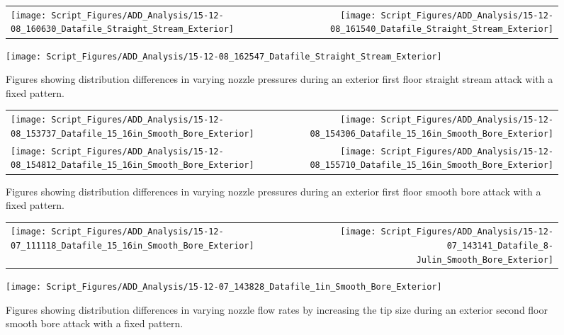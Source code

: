 \documentclass{article}
\begin{document}
\begin{figure}[ht]
\begin{tabular*}{\textwidth}{lr}
\texttt{[image: Script\_Figures/ADD\_Analysis/15-12-08\_160630\_Datafile\_Straight\_Stream\_Exterior]} &
\texttt{[image: Script\_Figures/ADD\_Analysis/15-12-08\_161540\_Datafile\_Straight\_Stream\_Exterior]} \\
\end{tabular*}
\centering
\texttt{[image: Script\_Figures/ADD\_Analysis/15-12-08\_162547\_Datafile\_Straight\_Stream\_Exterior]} \\
\caption{Figures showing distribution differences in varying nozzle pressures during an exterior first floor straight stream attack with a fixed pattern.}
\label{fig:Exterior_First_Floor_Varying_Nozzle_Pressure_SS_Fixed_Pattern}
\end{figure}

\begin{figure}[ht]
\begin{tabular*}{\textwidth}{lr}
\texttt{[image: Script\_Figures/ADD\_Analysis/15-12-08\_153737\_Datafile\_15\_16in\_Smooth\_Bore\_Exterior]} &
\texttt{[image: Script\_Figures/ADD\_Analysis/15-12-08\_154306\_Datafile\_15\_16in\_Smooth\_Bore\_Exterior]} \\
\texttt{[image: Script\_Figures/ADD\_Analysis/15-12-08\_154812\_Datafile\_15\_16in\_Smooth\_Bore\_Exterior]} &
\texttt{[image: Script\_Figures/ADD\_Analysis/15-12-08\_155710\_Datafile\_15\_16in\_Smooth\_Bore\_Exterior]} \\
\end{tabular*}
\caption{Figures showing distribution differences in varying nozzle pressures during an exterior first floor smooth bore attack with a fixed pattern.}
\label{fig:Exterior_First_Floor_Varying_Nozzle_Pressure_SB_Fixed_Pattern}
\end{figure}

\begin{figure}[ht]
\begin{tabular*}{\textwidth}{lr}
\texttt{[image: Script\_Figures/ADD\_Analysis/15-12-07\_111118\_Datafile\_15\_16in\_Smooth\_Bore\_Exterior]} &
\texttt{[image: Script\_Figures/ADD\_Analysis/15-12-07\_143141\_Datafile\_8-Julin\_Smooth\_Bore\_Exterior]} \\
\end{tabular*}
\centering
\texttt{[image: Script\_Figures/ADD\_Analysis/15-12-07\_143828\_Datafile\_1in\_Smooth\_Bore\_Exterior]}
\caption{Figures showing distribution differences in varying nozzle flow rates by increasing the tip size during an exterior second floor smooth bore attack with a fixed pattern.}
\label{fig:Exterior_Second_Floor_Varying_Flow_Rates_SB_Fixed_Pattern}
\end{figure}
\end{document}

